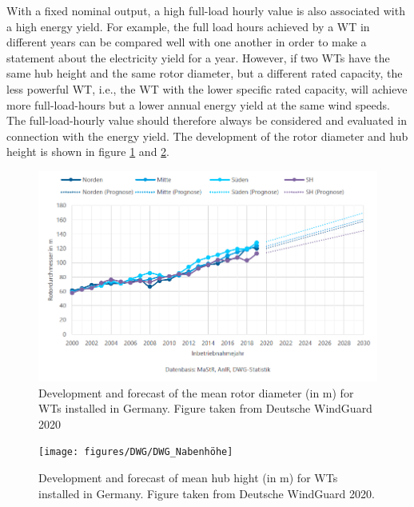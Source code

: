 \documentclass[a4paper,11pt]{article}
\begin{document}
With a fixed nominal output, a high full-load hourly value is also associated with a high energy yield. For example, the full load hours achieved by a WT in different years can be compared well with one another in order to make a statement about the electricity yield for a year. However, if two WTs have the same hub height and the same rotor diameter, but a different rated capacity, the less powerful WT, i.e., the WT with the lower specific rated capacity, will achieve more full-load-hours but a lower annual energy yield at the same wind speeds. The full-load-hourly value should therefore always be considered and evaluated in connection with the energy yield. The development of the rotor diameter and hub height is shown in figure \ref{fig:rotor} and \ref{fig:nabe}.
\begin{figure}

{\centering \includegraphics[width=1\linewidth]{figures/DWG/DWG_Rotordurchmesser} 

}

\caption{Development and forecast of the mean rotor diameter (in m) for WTs installed in Germany. Figure taken from Deutsche WindGuard 2020}\label{fig:rotor}
\end{figure}
\begin{figure}[H]

{\centering \texttt{[image: figures/DWG/DWG\_Nabenhöhe]} 

}

\caption{Development and forecast of mean hub hight (in m) for WTs installed in Germany. Figure taken from Deutsche WindGuard 2020.}\label{fig:nabe}
\end{figure}
\end{document}
